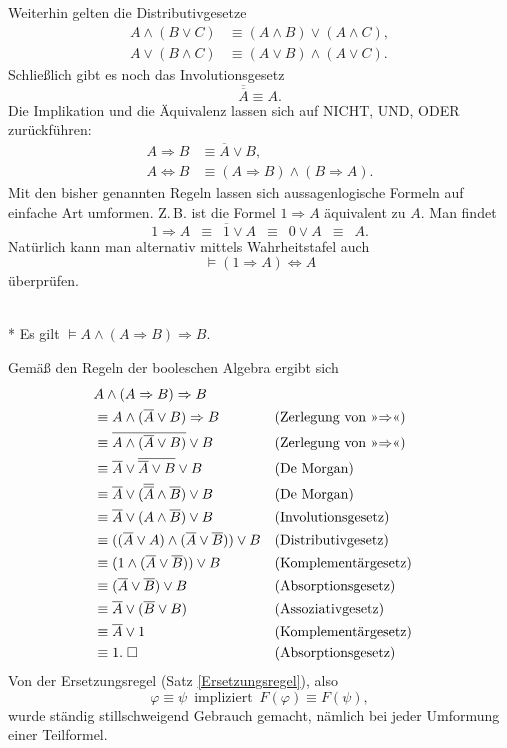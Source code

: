 Weiterhin gelten die Distributivgesetze
\begin{align}
A\land(B\lor C) &\equiv (A\land B)\lor (A\land C),\\
A\lor(B\land C) &\equiv (A\lor B)\land (A\lor C).
\end{align}
Schließlich gibt es noch das Involutionsgesetz
\begin{equation}
\overline {\overline A}\equiv A.
\end{equation}
Die Implikation und die Äquivalenz lassen sich auf NICHT, UND, ODER
zurückführen:%
\begin{align}
A\Rightarrow B &\equiv \overline A\lor B,\\
A\Leftrightarrow B &\equiv (A\Rightarrow B)\land (B\Rightarrow A).
\end{align}
Mit den bisher genannten Regeln lassen sich aussagenlogische Formeln
auf einfache Art umformen. Z.\,B. ist die Formel $1\Rightarrow A$
äquivalent zu $A$. Man findet
\[1\Rightarrow A\enspace\equiv\enspace\overline 1\lor A\enspace\equiv\enspace 0\lor A\enspace\equiv\enspace A.\]
Natürlich kann man alternativ mittels Wahrheitstafel auch
\[\models(1\Rightarrow A)\Leftrightarrow A\]
überprüfen.

\begin{Satz}%
\label{Formel-Modus-ponens}\mbox{}\\*
Es gilt $\models A\land (A\Rightarrow B)\Rightarrow B$.
\end{Satz}
 Gemäß den Regeln der booleschen Algebra ergibt sich
\begin{align}
& A\land (A\Rightarrow B)\Rightarrow B\\
& \equiv A\land (\overline A\lor B)\Rightarrow B && \text{(Zerlegung von »$\Rightarrow$«)}\\
& \equiv \overline{A\land (\overline A\lor B)}\lor B && \text{(Zerlegung von »$\Rightarrow$«)}\\
& \equiv \overline A\lor\overline{\overline A\lor B}\lor B && \text{(De Morgan)}\\
& \equiv \overline A\lor (\overline{\overline A}\land\overline B)\lor B && \text{(De Morgan)}\\
& \equiv \overline A\lor (A\land\overline B)\lor B && \text{(Involutionsgesetz)}\\
& \equiv ((\overline A\lor A)\land(\overline A\lor\overline B))\lor B && \text{(Distributivgesetz)}\\
& \equiv (1\land(\overline A\lor\overline B))\lor B && \text{(Komplementärgesetz)}\\
& \equiv (\overline A\lor\overline B)\lor B && \text{(Absorptionsgesetz)}\\
& \equiv \overline A\lor(\overline B\lor B) && \text{(Assoziativgesetz)}\\
& \equiv \overline A\lor 1 && \text{(Komplementärgesetz)}\\
& \equiv 1.\;\Box && \text{(Absorptionsgesetz)}
\end{align}
Von der Ersetzungsregel (Satz \ref{Ersetzungsregel}), also
\[\varphi\equiv\psi\enspace
\text{impliziert}\enspace F(\varphi)\equiv F(\psi),\]
wurde ständig stillschweigend Gebrauch gemacht, nämlich bei jeder
Umformung einer Teilformel.

